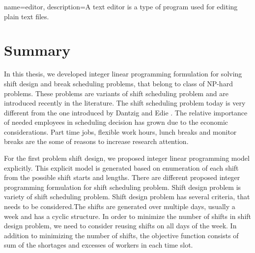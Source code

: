 %
%
%
%



{
  name={editor},
  description={A text editor is a type of program used for editing plain text files.}
}

\section{Summary}

In this thesis, we developed integer linear programming formulation for solving shift design and break scheduling problems, that belong to class of NP-hard problems. These problems are variants of shift scheduling problem and are introduced recently in the literature. The shift scheduling problem today is very different from the one introduced by Dantzig \cite{li:1954:dantzig} and Edie \cite{li:1954:edie}. The relative importance of needed employees in scheduling decision has grown due to the economic considerations. Part time jobs, flexible work hours, lunch breaks and monitor breaks are the some of reasons to increase research attention.

For the first problem shift design, we proposed integer linear programming model explicitly. This explicit model is generated based on enumeration of each shift from the possible shift starts and  lengths. There are different proposed integer programming formulation for shift scheduling problem. Shift design problem is variety of shift scheduling problem. Shift design problem has several criteria, that needs to be considered.The shifts are generated over multiple days, usually a week and has a cyclic structure. In order to minimize the number of shifts in shift design problem, we need to consider reusing shifts on all days of the week. In addition to minimizing the number of shifts, the objective function consists of sum of the shortages and excesses of workers in each time slot.

